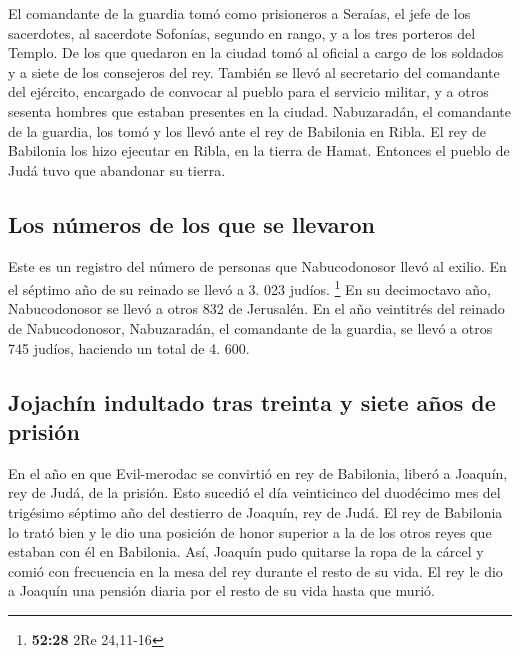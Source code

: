  El comandante de la guardia tomó como prisioneros a
Seraías, el jefe de los sacerdotes, al sacerdote Sofonías, segundo en
rango, y a los tres porteros del Templo.  De los que
quedaron en la ciudad tomó al oficial a cargo de los soldados y a siete
de los consejeros del rey. También se llevó al secretario del comandante
del ejército, encargado de convocar al pueblo para el servicio militar,
y a otros sesenta hombres que estaban presentes en la ciudad.
 Nabuzaradán, el comandante de la guardia, los tomó y los
llevó ante el rey de Babilonia en Ribla.  El rey de
Babilonia los hizo ejecutar en Ribla, en la tierra de Hamat. Entonces el
pueblo de Judá tuvo que abandonar su tierra.

\hypertarget{los-nuxfameros-de-los-que-se-llevaron}{%
\subsection{Los números de los que se
llevaron}\label{los-nuxfameros-de-los-que-se-llevaron}}

 Este es un registro del número de personas que
Nabucodonosor llevó al exilio. En el séptimo año de su reinado se llevó
a 3. 023 judíos. \footnote{\textbf{52:28} 2Re 24,11-16} 
En su decimoctavo año, Nabucodonosor se llevó a otros 832 de Jerusalén.
 En el año veintitrés del reinado de Nabucodonosor,
Nabuzaradán, el comandante de la guardia, se llevó a otros 745 judíos,
haciendo un total de 4. 600.

\hypertarget{jojachuxedn-indultado-tras-treinta-y-siete-auxf1os-de-prisiuxf3n}{%
\subsection{Jojachín indultado tras treinta y siete años de
prisión}\label{jojachuxedn-indultado-tras-treinta-y-siete-auxf1os-de-prisiuxf3n}}

 En el año en que Evil-merodac se convirtió en rey de
Babilonia, liberó a Joaquín, rey de Judá, de la prisión. Esto sucedió el
día veinticinco del duodécimo mes del trigésimo séptimo año del
destierro de Joaquín, rey de Judá.  El rey de Babilonia
lo trató bien y le dio una posición de honor superior a la de los otros
reyes que estaban con él en Babilonia.  Así, Joaquín pudo
quitarse la ropa de la cárcel y comió con frecuencia en la mesa del rey
durante el resto de su vida.  El rey le dio a Joaquín una
pensión diaria por el resto de su vida hasta que murió.
